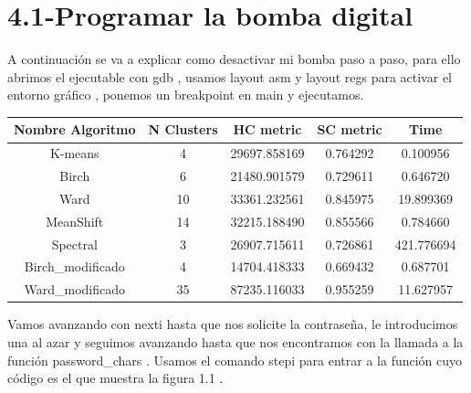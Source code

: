 	\tableofcontents %
	
	\listoffigures %
	
	\listoftables %
	
	\newpage
	
	
	\section[4.1-Programar la bomba digital]{4.1-Programar la bomba digital}
	
	A continuación se va a explicar como desactivar mi bomba paso a paso, para ello abrimos el ejecutable con gdb ,
	usamos layout asm y layout regs para activar el entorno gráfico , ponemos un breakpoint en main y ejecutamos. \\
	
	\begin{tabular}{c | c | c | c | c}
		\toprule
		Nombre Algoritmo &  N Clusters &     HC metric &  SC metric &        Time \\
		\midrule
		K-means          &           4 &  29697.858169 &   0.764292 &    0.100956 \\
		Birch            &           6 &  21480.901579 &   0.729611 &    0.646720 \\
		Ward             &          10 &  33361.232561 &   0.845975 &   19.899369 \\
		MeanShift        &          14 &  32215.188490 &   0.855566 &    0.784660 \\
		Spectral         &           3 &  26907.715611 &   0.726861 &  421.776694 \\
		Birch\_modificado &           4 &  14704.418333 &   0.669432 &    0.687701 \\
		Ward\_modificado  &          35 &  87235.116033 &   0.955259 &   11.627957 \\
		\bottomrule
	\end{tabular}
	
	\vspace{0.1in}
	
	Vamos avanzando con nexti hasta que nos solicite la contraseña, le introducimos una al azar y seguimos avanzando hasta que nos encontramos
	con la llamada a la función password\_chars . Usamos el comando stepi para entrar a la función cuyo código es el que muestra la figura 1.1 .
	
